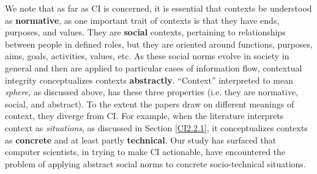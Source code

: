 \documentclass[../thesis.tex]{subfiles}
\begin{document}
\bigskip

We note that as far as CI is concerned, it is essential that contexts be
understood as \textbf{normative}, as one important trait of contexts is
that they have ends, purposes, and values. They are \textbf{social}
contexts, pertaining to relationships between people in defined roles,
but they are oriented around functions, purposes, aims, goals,
activities, values, etc. As these social norms evolve in society in
general and then are applied to particular cases of information flow,
contextual integrity conceptualizes contexts \textbf{abstractly}.
``Context'' interpreted to mean
\textit{sphere}, as discussed above, has these three properties (i.e.
they are normative, social, and abstract). To the extent the papers
draw on different meanings of context, they diverge from CI. For
example, when the literature interprets context as \textit{situations},
as discussed in Section \ref{CI2.2.1}, it conceptualizes contexts as
\textbf{concrete} and at least partly \textbf{technical}. Our study has
surfaced that computer scientists, in trying to make CI actionable,
have encountered the problem of applying abstract social norms to
concrete socio-technical situations.
\end{document}
